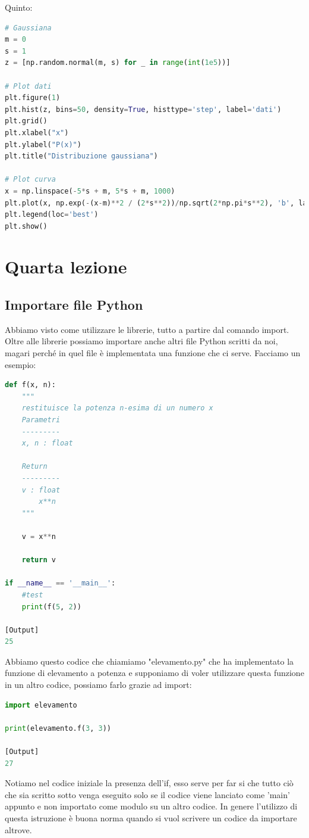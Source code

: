\documentclass[10pt,a4paper]{article}
\begin{document}
Quinto:
\begin{lstlisting}[language=Python]
# Gaussiana
m = 0
s = 1
z = [np.random.normal(m, s) for _ in range(int(1e5))]

# Plot dati
plt.figure(1)
plt.hist(z, bins=50, density=True, histtype='step', label='dati')
plt.grid()
plt.xlabel("x")
plt.ylabel("P(x)")
plt.title("Distribuzione gaussiana")

# Plot curva
x = np.linspace(-5*s + m, 5*s + m, 1000)
plt.plot(x, np.exp(-(x-m)**2 / (2*s**2))/np.sqrt(2*np.pi*s**2), 'b', label=f"N({m}, {s})")
plt.legend(loc='best')
plt.show()
\end{lstlisting}


\newpage
\section{Quarta lezione}

\subsection{Importare file Python}
Abbiamo visto come utilizzare le librerie, tutto a partire dal comando import. Oltre alle librerie possiamo importare anche altri file Python scritti da noi, magari perché in quel file è implementata una funzione che ci serve. Facciamo un esempio:

\begin{lstlisting}[language=Python]
def f(x, n):
    """
    restituisce la potenza n-esima di un numero x
    Parametri
    ---------
    x, n : float
    
    Return
    ---------
    v : float
        x**n
    """
    
    v = x**n
    
    return v
    
if __name__ == '__main__':
    #test
    print(f(5, 2))
    
[Output]
25
\end{lstlisting}
Abbiamo questo codice che chiamiamo "elevamento.py" che ha implementato la funzione di elevamento a potenza e supponiamo di voler utilizzare questa funzione in un altro codice, possiamo farlo grazie ad import:

\begin{lstlisting}[language=Python]
import elevamento

print(elevamento.f(3, 3))

[Output]
27
\end{lstlisting}
Notiamo nel codice iniziale la presenza dell'if, esso serve per far si che tutto ciò che sia scritto sotto venga eseguito solo se il codice viene lanciato come 'main' appunto e non importato come modulo su un altro codice. In genere l'utilizzo di questa istruzione è buona norma quando si vuol scrivere un codice da importare altrove.
\end{document}

